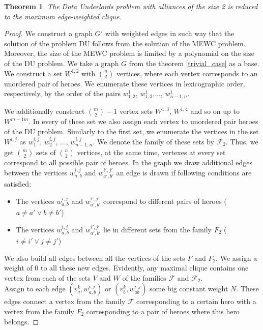 \documentclass{article}
\newtheorem{theorem}{Theorem}
\begin{document}
\begin{theorem}
\label{second_case}
    The Dota Underlords problem with alliances of the size 2 is reduced to the maximum edge-weighted clique.
\end{theorem}

\begin{proof}
We construct a graph $G'$ with weighted edges in such way that the solution of the problem DU follows from the solution of the MEWC problem. Moreover, the size of the MEWC problem is limited by a polynomial on the size of the DU problem. We take a graph $G$ from the theorem \ref{trivial_case} as a base. We construct a set $ W^{1,2} $ with $ \binom{n}{2} $ vertices, where each vertex corresponds to an unordered pair of heroes. We enumerate these vertices in lexicographic order, respectively, by the order of the pairs $ w_{1,2}^1 $, $w_{1,3}^1 $,..., $w_{n-1, n}^1$. 

    We additionally construct $\binom{m}{2}-1$ vertex sets $W^{1,3} $, $W^{1,4} $ and so on up to $W^{m-1 m}$. In every of these set we also assign each vertex to unordered pair heroes of the DU problem. Similarly to the first set, we enumerate the vertices in the set $W^{i, j} $ as $ w_1^{i, j} $, $ w_2^{i,j} $, ..., $ w_{n-1, n }^{i, j} $.   
   We denote the family of these sets by $\mathcal{F}_2 $. Thus, we get $ \binom {m}{2} $ sets of $ \binom{n}{2}$ vertices, at the same time, vertexes at every set correspond to all possible pair of heroes.    
    In the graph we draw additional edges between the vertices $ w_{a, b}^{i, j} $ and $w_{a',b'}^{i',j'} $ an edge is drawn if following conditions are satisfied:
    \begin{itemize}
        \item The vertices $ w_{a, b}^{i, j} $ and $w_ {a', b'}^{i',j'} $ correspond to different pairs of heroes ($ a \neq a '\lor b \neq b'$)
        \item The vertices $ w_ {a,b}^{i, j} $ and $w_{a', b'} ^{i', j'} $ lie in different sets from the family $ F_2 $ ($ i \neq i '\lor j \neq j' $)
    \end{itemize}
    
    We also build all edges between all the vertices of the sets $F$ and $F_2$. We assign a weight of 0 to all these new edges. Evidently, any maximal clique contains one vertex from each of the sets $V$ and $W$ of the families $ \mathcal {F} $ and $ \mathcal {F}_2 $. \\
    Assign to each edge  $ (v_a^ k, w_ {a, b}^{i, j}) $ or $ (v_b^k, w_ {ab}^{i,j}) $ some big constant weight $N$. These edges connect a vertex from the family $\mathcal{F}$ corresponding to a certain hero with a vertex from the family $ F_2 $ corresponding to a pair of heroes where this hero belongs.
    

\end{proof}
\end{document}
